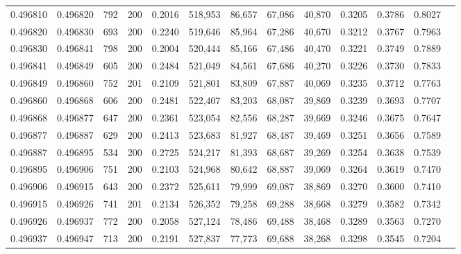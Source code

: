 \begin{tabular}{rrrrrrrrrrrrr}
0.496810 & 0.496820 &   792 & 200 &                                     0.2016 & 518,953 &  86,657 &  67,086 &  40,870 & 0.3205 & 0.3786 & 0.8027 \\
0.496820 & 0.496830 &   693 & 200 &                                     0.2240 & 519,646 &  85,964 &  67,286 &  40,670 & 0.3212 & 0.3767 & 0.7963 \\
0.496830 & 0.496841 &   798 & 200 &                                     0.2004 & 520,444 &  85,166 &  67,486 &  40,470 & 0.3221 & 0.3749 & 0.7889 \\
0.496841 & 0.496849 &   605 & 200 &                                     0.2484 & 521,049 &  84,561 &  67,686 &  40,270 & 0.3226 & 0.3730 & 0.7833 \\
0.496849 & 0.496860 &   752 & 201 &                                     0.2109 & 521,801 &  83,809 &  67,887 &  40,069 & 0.3235 & 0.3712 & 0.7763 \\
0.496860 & 0.496868 &   606 & 200 &                                     0.2481 & 522,407 &  83,203 &  68,087 &  39,869 & 0.3239 & 0.3693 & 0.7707 \\
0.496868 & 0.496877 &   647 & 200 &                                     0.2361 & 523,054 &  82,556 &  68,287 &  39,669 & 0.3246 & 0.3675 & 0.7647 \\
0.496877 & 0.496887 &   629 & 200 &                                     0.2413 & 523,683 &  81,927 &  68,487 &  39,469 & 0.3251 & 0.3656 & 0.7589 \\
0.496887 & 0.496895 &   534 & 200 &                                     0.2725 & 524,217 &  81,393 &  68,687 &  39,269 & 0.3254 & 0.3638 & 0.7539 \\
0.496895 & 0.496906 &   751 & 200 &                                     0.2103 & 524,968 &  80,642 &  68,887 &  39,069 & 0.3264 & 0.3619 & 0.7470 \\
0.496906 & 0.496915 &   643 & 200 &                                     0.2372 & 525,611 &  79,999 &  69,087 &  38,869 & 0.3270 & 0.3600 & 0.7410 \\
0.496915 & 0.496926 &   741 & 201 &                                     0.2134 & 526,352 &  79,258 &  69,288 &  38,668 & 0.3279 & 0.3582 & 0.7342 \\
0.496926 & 0.496937 &   772 & 200 &                                     0.2058 & 527,124 &  78,486 &  69,488 &  38,468 & 0.3289 & 0.3563 & 0.7270 \\
0.496937 & 0.496947 &   713 & 200 &                                     0.2191 & 527,837 &  77,773 &  69,688 &  38,268 & 0.3298 & 0.3545 & 0.7204 \\

\end{tabular}
